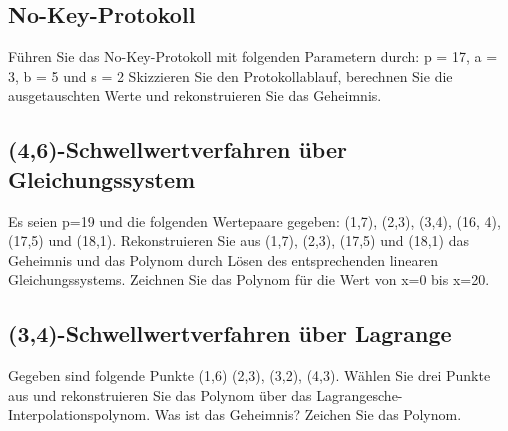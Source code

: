 \subsection{No-Key-Protokoll}
Führen Sie das No-Key-Protokoll mit folgenden Parametern durch:
p = 17, a = 3, b = 5 und s = 2
Skizzieren Sie den Protokollablauf, berechnen Sie die ausgetauschten Werte und
rekonstruieren Sie das Geheimnis.

\subsection{(4,6)-Schwellwertverfahren über Gleichungssystem}
Es seien p=19 und die folgenden Wertepaare gegeben: (1,7), (2,3), (3,4), (16, 4),
(17,5) und (18,1). Rekonstruieren Sie aus (1,7), (2,3), (17,5) und (18,1) das
Geheimnis und das Polynom durch Lösen des entsprechenden linearen
Gleichungssystems.
Zeichnen Sie das Polynom für die Wert von x=0 bis x=20.


\subsection{(3,4)-Schwellwertverfahren über Lagrange}
Gegeben sind folgende Punkte (1,6) (2,3), (3,2), (4,3).
Wählen Sie drei Punkte aus und rekonstruieren Sie das Polynom über das
Lagrangesche-Interpolationspolynom.
Was ist das Geheimnis? Zeichen Sie das Polynom.
